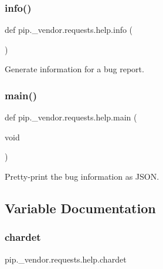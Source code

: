 \subsubsection{\texorpdfstring{info()}{info()}}
{\footnotesize\ttfamily def pip.\+\_\+vendor.\+requests.\+help.\+info (\begin{DoxyParamCaption}{ }\end{DoxyParamCaption})}

\begin{DoxyVerb}Generate information for a bug report.\end{DoxyVerb}
 \mbox{\label{namespacepip_1_1__vendor_1_1requests_1_1help_a2f749dc86a7034a0194a6913b626bc46}} 
\subsubsection{\texorpdfstring{main()}{main()}}
{\footnotesize\ttfamily def pip.\+\_\+vendor.\+requests.\+help.\+main (\begin{DoxyParamCaption}\item[{void}]{ }\end{DoxyParamCaption})}

\begin{DoxyVerb}Pretty-print the bug information as JSON.\end{DoxyVerb}
 

\subsection{Variable Documentation}
\mbox{\label{namespacepip_1_1__vendor_1_1requests_1_1help_a20669df7059afb432822bd09174eb5d5}} 
\subsubsection{\texorpdfstring{chardet}{chardet}}
{\footnotesize\ttfamily pip.\+\_\+vendor.\+requests.\+help.\+chardet}

